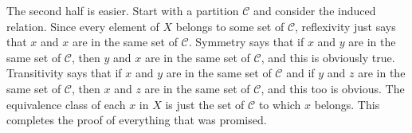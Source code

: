 The second half is easier. Start with a partition $\mathcal{C}$ and consider the induced relation. Since every element of $X$ belongs to some set of $\mathcal{C}$, reflexivity just says that $x$ and $x$ are in the same set of $\mathcal{C}$. Symmetry says that if $x$ and $y$ are in the same set of $\mathcal{C}$, then $y$ and $x$ are in the same set of $\mathcal{C}$, and this is obviously true.  Transitivity says that if $x$ and $y$ are in the same set of $\mathcal{C}$ and if $y$ and $z$ are in the same set of $\mathcal{C}$, then $x$ and $z$ are in the same set of $\mathcal{C}$, and this too is obvious. The equivalence class of each $x$ in $X$ is just the set of $\mathcal{C}$ to which $x$ belongs. This completes the proof of everything that was promised.
